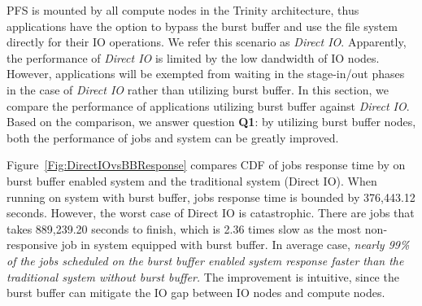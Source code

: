 
PFS is mounted by all compute nodes in the Trinity architecture, thus applications have the
option to bypass the burst buffer and use the file system directly for their IO operations. 
We refer this scenario as \textit{Direct IO}. Apparently, the performance of \textit{Direct IO}
is limited by the low dandwidth of IO nodes. However, applications will be exempted from 
waiting in the stage-in/out phases in the case of \textit{Direct IO} rather than utilizing burst buffer.
In this section, we compare the performance of applications utilizing burst buffer
against \textit{Direct IO}.
Based on the comparison, we answer question \textbf{Q1}: by utilizing burst buffer nodes,
both the performance of jobs and system can be greatly improved. 



Figure~\ref{Fig:DirectIOvsBBResponse} compares CDF of jobs response
time by on burst buffer enabled system and the traditional system (Direct IO).
When running on system with burst buffer,
jobs response time is bounded by 376,443.12 seconds.
However, the worst case of Direct IO is catastrophic.
There are jobs that takes 889,239.20 seconds to finish,
which is 2.36 times slow as the most non-responsive job
in system equipped with burst buffer.
In average case, \textit{nearly 99\% of the jobs scheduled on the burst buffer enabled system
response faster than the traditional system without burst buffer.}
The improvement is intuitive, since the burst buffer can mitigate the IO gap between
IO nodes and compute nodes.



